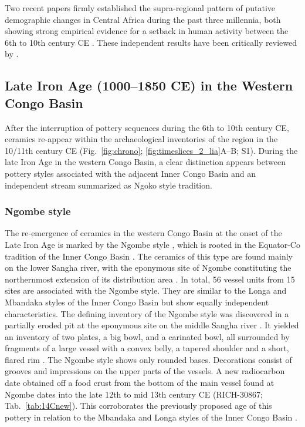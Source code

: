 \documentclass[smallextended,natbib]{svjour3}       %
\begin{document}
Two recent papers firmly established the supra-regional pattern of putative demographic changes in Central Africa during the past three millennia, both showing strong empirical evidence for a setback in human activity between the 6th to 10th century CE \citep{deSaulieu.2021a,Seidensticker.2021}. These independent results have been critically reviewed by \citet{Clist.2023a}.

\subsection*{Late Iron Age (1000--1850 CE) in the Western Congo Basin}

After the interruption of pottery sequences during the 6th to 10th century CE, ceramics re-appear within the archaeological inventories of the region in the 10/11th century CE (Fig.~\ref{fig:chrono}; \ref{fig:timeslices_2_lia}A--B; S1). During the late Iron Age in the western Congo Basin, a clear distinction appears between pottery styles associated with the adjacent Inner Congo Basin and an independent stream summarized as Ngoko style tradition.

\subsubsection*{Ngombe style}

The re-emergence of ceramics in the western Congo Basin at the onset of the Late Iron Age is marked by the Ngombe style \citep[125--128]{Seidensticker.2021e}, which is rooted in the Equator-Co tradition of the Inner Congo Basin \citep[222 Fig. 4]{Wotzka.1995}. The ceramics of this type are found mainly on the lower Sangha river, with the eponymous site of Ngombe constituting the northernmost extension of its distribution area \citep[127 Fig. 54]{Seidensticker.2021e}. In total, 56 vessel units from 15 sites are associated with the Ngombe style. They are similar to the Longa and Mbandaka styles \citep[121--128, 139--143]{Wotzka.1995} of the Inner Congo Basin but show equally independent characteristics. The defining inventory of the Ngombe style was discovered in a partially eroded pit at the eponymous site on the middle Sangha river \citep[305--306]{Seidensticker.2021e}. It yielded an inventory of two plates, a big bowl, and a carinated bowl, all surrounded by fragments of a large vessel with a convex belly, a tapered shoulder and a short, flared rim \citep[Fig.~\ref{fig:sangha}.10--12;][Pl. 42.15--44.2]{Seidensticker.2021e}. The Ngombe style shows only rounded bases. Decorations consist of grooves and impressions on the upper parts of the vessels. A new radiocarbon date obtained off a food crust from the bottom of the main vessel found at Ngombe dates into the late 12th to mid 13th century CE (RICH-30867; Tab.~\ref{tab:14Cnew}). This corroborates the previously proposed age of this pottery in relation to the Mbandaka and Longa styles of the Inner Congo Basin \citep[Fig.~\ref{fig:chrono}; \ref{fig:timeslices_2_lia}B--C; S1; Tab.~S1;][126--128]{Seidensticker.2021e}. 
\end{document}
